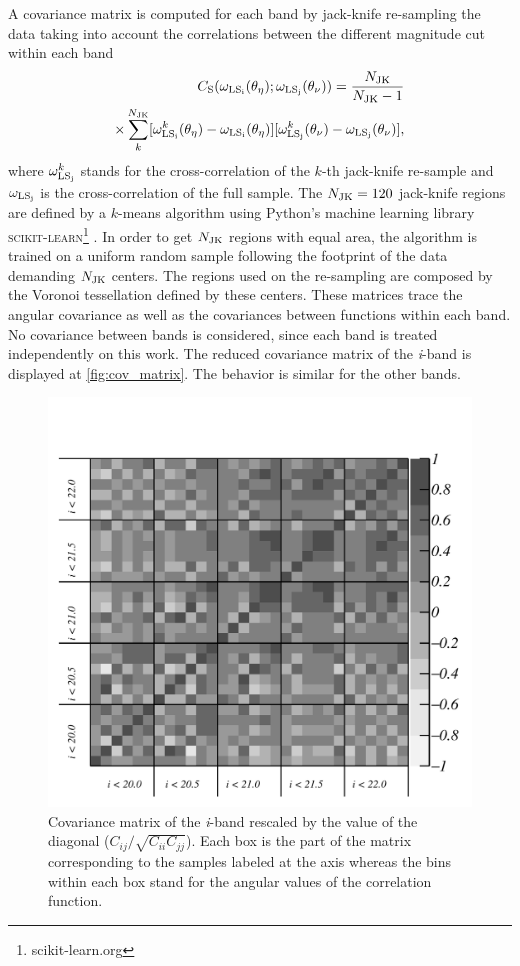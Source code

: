 A covariance matrix is computed for each band by jack-knife re-sampling the data taking into account the correlations between the different magnitude cut within each band
\begin{eqnarray}
C_{\rm S}(\omega_{\rm LS_i}(\theta_\eta);\omega_{\rm LS_j}(\theta_\nu)) = \frac{N_{\rm JK}}{N_{\rm JK}-1}\\
\times \sum\limits_k^{N_{\rm JK}}[\omega_{\rm LS_i}^k(\theta_\eta)-\omega_{\rm LS_i}(\theta_\eta)][\omega_{\rm LS_j}^k(\theta_\nu)-\omega_{\rm LS_j}(\theta_\nu)]\nonumber,
\end{eqnarray}
where $\omega^k_{\rm LS_j}$ stands for the cross-correlation of the $k$-th jack-knife re-sample and $\omega_{\rm LS_j}$ is the cross-correlation of the full sample. The $N_{\rm JK}= 120$ jack-knife regions are defined by a $k$-means algorithm \cite{macqueen1967some} using Python's machine learning library {\scshape scikit-learn}\footnote{scikit-learn.org} \cite{scikit-learn}. In order to get $N_{\rm JK}$ regions with equal area, the algorithm is trained on a uniform random sample following the footprint of the data demanding $N_{\rm JK}$ centers. The regions used on the re-sampling are composed by the Voronoi tessellation defined by these centers. These matrices trace the angular covariance as well as the covariances between functions within each band. No covariance between bands is considered, since each band is treated independently on this work. The reduced covariance matrix of the {\itshape i}-band is displayed at \autoref{fig:cov_matrix}. The behavior is similar for the other bands.
\begin{figure}
\includegraphics[width=\textwidth,trim={0 0 0 2cm},clip]{./figures/cov_matrix_mag_auto_i.pdf}
\caption{Covariance matrix of the {\it i}-band rescaled by the value of the diagonal ($C_{ij}/\sqrt{C_{ii}C_{jj}}$). Each box is the part of the matrix corresponding to the samples labeled at the axis whereas the bins within each box stand for the angular values of the correlation function.}
\label{fig:cov_matrix}
\end{figure}
\newline

